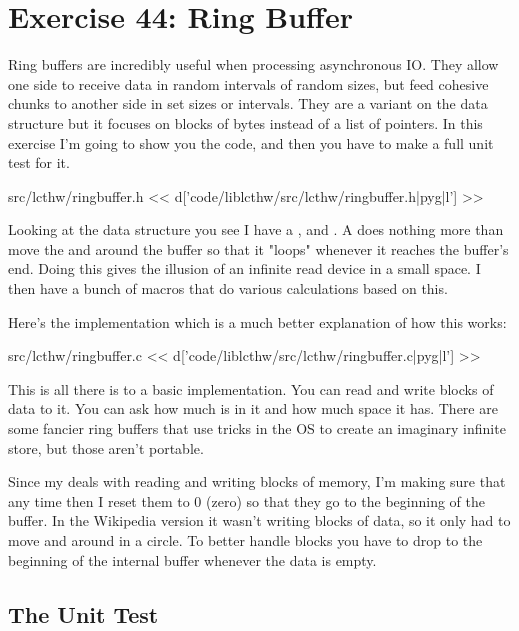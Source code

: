 \chapter{Exercise 44: Ring Buffer}

Ring buffers are incredibly useful when processing asynchronous IO.  They allow
one side to receive data in random intervals of random sizes, but feed cohesive
chunks to another side in set sizes or intervals.  They are a variant on the 
 data structure but it focuses on blocks of bytes instead of
a list of pointers.  In this exercise I'm going to show you the 
 code, and then you have to make a full unit test
for it.

\begin{code}{src/lcthw/ringbuffer.h}
<< d['code/liblcthw/src/lcthw/ringbuffer.h|pyg|l'] >>
\end{code}

Looking at the data structure you see I have a , 
 and .  A  does nothing
more than move the  and  around the buffer
so that it "loops" whenever it reaches the buffer's end.  Doing
this gives the illusion of an infinite read device in a small space.
I then have a bunch of macros that do various calculations based on this.

Here's the implementation which is a much better explanation of how
this works:

\begin{code}{src/lcthw/ringbuffer.c}
<< d['code/liblcthw/src/lcthw/ringbuffer.c|pyg|l'] >>
\end{code}

This is all there is to a basic  implementation.  You
can read and write blocks of data to it.  You can ask how much is in it
and how much space it has.  There are some fancier ring buffers that use
tricks in the OS to create an imaginary infinite store, but those aren't
portable.

Since my  deals with reading and writing blocks of
memory, I'm making sure that any time  then I
reset them to 0 (zero) so that they go to the beginning of the
buffer.  In the Wikipedia version it wasn't writing blocks of
data, so it only had to move  and  around
in a circle.  To better handle blocks you have to drop to the
beginning of the internal buffer whenever the data is empty.

\section{The Unit Test}

